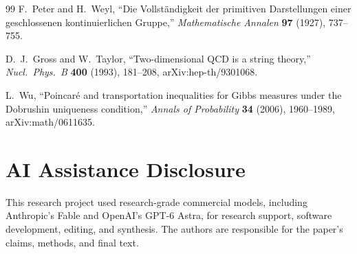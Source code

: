 \documentclass[11pt]{article}
\numberwithin{equation}{section}
\theoremstyle{remark}
\begin{document}
\begin{thebibliography}{99}
F.~Peter and H.~Weyl,
``Die Vollst\"andigkeit der primitiven Darstellungen einer geschlossenen kontinuierlichen Gruppe,''
\emph{Mathematische Annalen} \textbf{97} (1927), 737--755.

D.~J.~Gross and W.~Taylor,
``Two-dimensional QCD is a string theory,''
\emph{Nucl.\ Phys.\ B} \textbf{400} (1993), 181--208,
arXiv:hep-th/9301068.

L.~Wu,
``Poincar\'e and transportation inequalities for Gibbs measures under the Dobrushin uniqueness condition,''
\emph{Annals of Probability} \textbf{34} (2006), 1960--1989,
arXiv:math/0611635.

\end{thebibliography}

\section*{AI Assistance Disclosure}
This research project used research-grade commercial models, including
Anthropic's Fable and OpenAI's GPT-6 Astra, for research support, software
development, editing, and synthesis. The authors are responsible for the
paper's claims, methods, and final text.
\end{document}
